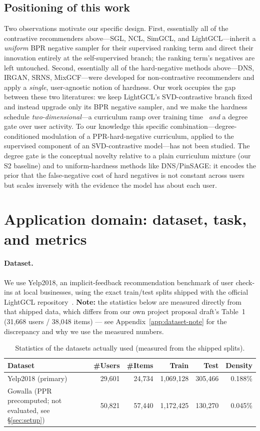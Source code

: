 \documentclass{article}
\begin{document}
\subsection{Positioning of this work}
Two observations motivate our specific design. First, essentially all of the
contrastive recommenders above---SGL, NCL, SimGCL, and LightGCL---inherit a
\emph{uniform} BPR negative sampler for their supervised ranking term and direct
their innovation entirely at the self-supervised branch; the ranking term's
negatives are left untouched. Second, essentially all of the hard-negative methods
above---DNS, IRGAN, SRNS, MixGCF---were developed for non-contrastive
recommenders and apply a \emph{single}, user-agnostic notion of hardness. Our work
occupies the gap between these two literatures: we keep LightGCL's SVD-contrastive
branch fixed and instead upgrade only its BPR negative sampler, and we make the
hardness schedule \emph{two-dimensional}---a curriculum ramp over training
time~\cite{curriculum} \emph{and} a degree gate over user activity. To our
knowledge this specific combination---degree-conditioned modulation of a
PPR-hard-negative curriculum, applied to the supervised component of an
SVD-contrastive model---has not been studied. The degree gate is the conceptual
novelty relative to a plain curriculum mixture (our S2 baseline) and to
uniform-hardness methods like DNS/PinSAGE: it encodes the prior that the
false-negative cost of hard negatives is not constant across users but scales
inversely with the evidence the model has about each user.

\section{Application domain: dataset, task, and metrics}

\paragraph{Dataset.} We use Yelp2018, an implicit-feedback recommendation benchmark of
user check-ins at local businesses, using the exact train/test splits shipped with the
official LightGCL repository~\cite{lightgcl}. \textbf{Note:} the statistics below are
measured directly from that shipped data, which differs from our own project proposal
draft's Table~1 (31{,}668 users / 38{,}048 items) --- see Appendix~\ref{app:dataset-note}
for the discrepancy and why we use the measured numbers.

\begin{table}[h]
\centering
\caption{Statistics of the datasets actually used (measured from the shipped splits).}
\label{tab:dataset-stats}
\begin{tabular}{lrrrrr}
\toprule
Dataset & \#Users & \#Items & Train & Test & Density \\
\midrule
Yelp2018 (primary) & 29{,}601 & 24{,}734 & 1{,}069{,}128 & 305{,}466 & 0.188\% \\
Gowalla (PPR precomputed; not evaluated, see \S\ref{sec:setup}) & 50{,}821 & 57{,}440 & 1{,}172{,}425 & 130{,}270 & 0.045\% \\
\bottomrule
\end{tabular}
\end{table}
\end{document}
